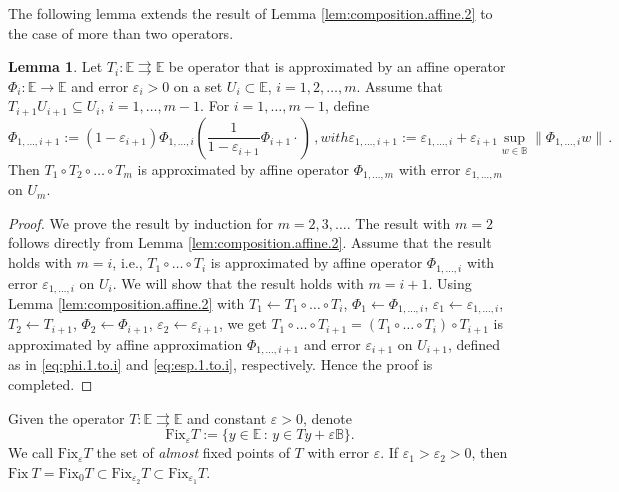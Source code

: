 \documentclass[12pt]{article}
\theoremstyle{definition}
\newtheorem{lemma}{Lemma}
\renewcommand{\equiv}{:=}
\newcommand{\Fix}{\mathrm{Fix}\ }
\newcommand{\Fixepsilon}{{\mathrm{Fix}_{\varepsilon} }}
\begin{document}
The following lemma extends the result of Lemma \ref{lem:composition.affine.2} to the case of more than two operators.
\begin{lemma}\label{lem:composition.affine.m}
Let $T_i:\mathbb E\rightrightarrows \mathbb E$ be operator that is approximated by an affine operator $\Phi_i:\mathbb E\to \mathbb E$ and error $\varepsilon_i>0$ on a set $U_i\subset \mathbb E$, $i=1,2,\dots,m$.
Assume that $T_{i+1}U_{i+1}\subseteq U_i$, $i=1,\dots,m-1$.
For $i=1,\dots,m-1$, define
\begin{subequations}
\begin{equation}\label{eq:phi.1.to.i}
\Phi_{1,\dots,i+1}\equiv(1-\varepsilon_{i+1})\Phi_{1,\dots,i}(\frac{1}{1-\varepsilon_{i+1}}\Phi_{i+1}\cdot)\,,
\end{equation}
with
\begin{equation}\label{eq:esp.1.to.i}
\varepsilon_{1,\dots,i+1}\equiv\varepsilon_{1,\dots,i}+\varepsilon_{i+1} \sup_{w\in\mathbb B}{\|\Phi_{1,\dots,i}w\|}\,.
\end{equation}
\end{subequations}
Then $T_1\circ T_2 \circ \dots \circ T_m$ is approximated by affine operator $\Phi_{1,\dots,m}$ with error $\varepsilon_{1,\dots,m}$ on $U_m$.
\end{lemma}
\begin{proof}
    We prove the result by induction for $m=2,3,\dots$.
    The result with $m=2$  follows directly from Lemma \ref{lem:composition.affine.2}.
    Assume that the result holds with $m=i$, i.e., $T_1\circ \dots\circ T_i$ is approximated by affine operator $\Phi_{1,\dots,i}$ with error $\varepsilon_{1,\dots,i}$ on $U_i$.
    We will show that the result holds with $m=i+1$.
    Using Lemma \ref{lem:composition.affine.2} with $T_1\leftarrow T_1\circ \dots\circ T_i$, $\Phi_1\leftarrow \Phi_{1,\dots,i}$, $\varepsilon_1\leftarrow \varepsilon_{1,\dots,i}$, $T_2\leftarrow T_{i+1}$, $\Phi_2\leftarrow \Phi_{i+1}$, $\varepsilon_2\leftarrow \varepsilon_{i+1}$, we get $T_1\circ \dots\circ T_{i+1}=(T_1\circ \dots\circ T_i)\circ T_{i+1}$ is approximated by affine approximation $\Phi_{1,\dots,i+1}$ and error $\varepsilon_{i+1}$ on $U_{i+1}$, defined as in \eqref{eq:phi.1.to.i} and \eqref{eq:esp.1.to.i}, respectively. 
    Hence the proof is completed.
\end{proof}

Given the operator $T:\mathbb E\rightrightarrows \mathbb E$ and constant $\varepsilon>0$, denote
\begin{equation}
\Fixepsilon T\equiv\{y\in\mathbb E\,:\, y\in Ty +\varepsilon \mathbb B\}.
\end{equation}
We call $\Fixepsilon T$ the set of {\em almost} fixed points of $T$ with error $\varepsilon$.
If $\varepsilon_1>\varepsilon_2>0$, then $\Fix T=\mathrm{Fix}_{0}T\subset \mathrm{Fix}_{\varepsilon_2}T\subset\mathrm{Fix}_{\varepsilon_1}T$.
\end{document}
